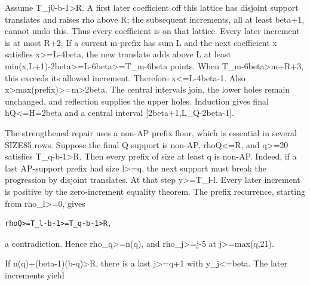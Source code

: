 \documentclass[10pt,a4paper]{article}
\theoremstyle{definition}
\begin{document}
Assume T\_\allowbreak{}j0-b-1\textgreater R. A first later coefficient off this
lattice has disjoint support translates and raises rho above R; the
subsequent increments,\allowbreak{} all at least beta+\allowbreak{}1,\allowbreak{} cannot undo this. Thus every
coefficient is on that lattice. Every later increment is at most R+\allowbreak{}2. If
a current m-prefix has sum L and the next coefficient x satisfies
x\textgreater=\allowbreak{}L-4beta,\allowbreak{} the new translate adds above L at least
min(x,\allowbreak{}L+\allowbreak{}1)-2beta\textgreater=\allowbreak{}L-6beta\textgreater=\allowbreak{}T\_\allowbreak{}m-6beta points. When
T\_\allowbreak{}m-6beta\textgreater m+\allowbreak{}R+\allowbreak{}3,\allowbreak{} this exceeds its allowed increment.
Therefore x\textless=\allowbreak{}L-4beta-1. Also
x\textgreater max(prefix)\textgreater=\allowbreak{}m\textgreater2beta. The central
intervals join,\allowbreak{} the lower holes remain unchanged,\allowbreak{} and reflection
supplies the upper holes. Induction gives final hQ\textless=\allowbreak{}H=\allowbreak{}2beta and
a central interval {[}2beta+\allowbreak{}1,\allowbreak{}L\_\allowbreak{}Q-2beta-1{]}.

The strengthened repair uses a non-AP prefix floor,\allowbreak{} which is essential
in several SIZE85 rows. Suppose the final Q support is non-AP,\allowbreak{}
rhoQ\textless=\allowbreak{}R,\allowbreak{} and q\textgreater=\allowbreak{}20 satisfies T\_\allowbreak{}q-b-1\textgreater R.
Then every prefix of size at least q is non-AP. Indeed,\allowbreak{} if a last
AP-support prefix had size l\textgreater=\allowbreak{}q,\allowbreak{} the next support must break
the progression by disjoint translates. At that step
y\textgreater=\allowbreak{}T\_\allowbreak{}l-l. Every later increment is positive by the
zero-increment equality theorem. The prefix recurrence,\allowbreak{} starting from
rho\_\allowbreak{}l\textgreater=\allowbreak{}0,\allowbreak{} gives

\begin{lstlisting}
rhoQ>=T_l-b-1>=T_q-b-1>R,
\end{lstlisting}

a contradiction. Hence rho\_\allowbreak{}q\textgreater=\allowbreak{}n(q),\allowbreak{} and
rho\_\allowbreak{}j\textgreater=\allowbreak{}j-5 at j\textgreater=\allowbreak{}max(q,\allowbreak{}21).

If n(q)+\allowbreak{}(beta-1)(b-q)\textgreater R,\allowbreak{} there is a last j\textgreater=\allowbreak{}q+\allowbreak{}1
with y\_\allowbreak{}j\textless=\allowbreak{}beta. The later increments yield
\end{document}
